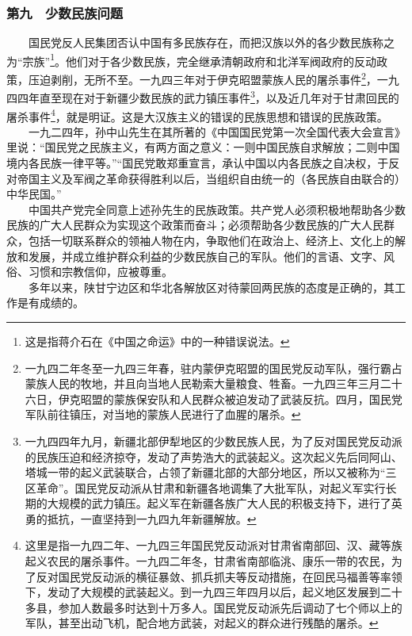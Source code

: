\documentclass[cn,11pt,chinese]{elegantbook}
\def\myformat#1{\hfil\hfil #1}
\begin{document}
\subsubsection*{\myformat{第九　少数民族问题}}
　　国民党反人民集团否认中国有多民族存在，而把汉族以外的各少数民族称之为“宗族”\footnote[23]{  这是指蒋介石在《中国之命运》中的一种错误说法。}。他们对于各少数民族，完全继承清朝政府和北洋军阀政府的反动政策，压迫剥削，无所不至。一九四三年对于伊克昭盟蒙族人民的屠杀事件\footnote[24]{ 一九四二年冬至一九四三年春，驻内蒙伊克昭盟的国民党反动军队，强行霸占蒙族人民的牧地，并且向当地人民勒索大量粮食、牲畜。一九四三年三月二十六日，伊克昭盟的蒙族保安队和人民群众被迫发动了武装反抗。四月，国民党军队前往镇压，对当地的蒙族人民进行了血腥的屠杀。}，一九四四年直至现在对于新疆少数民族的武力镇压事件\footnote[25]{ 一九四四年九月，新疆北部伊犁地区的少数民族人民，为了反对国民党反动派的民族压迫和经济掠夺，发动了声势浩大的武装起义。这次起义先后同阿山、塔城一带的起义武装联合，占领了新疆北部的大部分地区，所以又被称为“三区革命”。国民党反动派从甘肃和新疆各地调集了大批军队，对起义军实行长期的大规模的武力镇压。起义军在新疆各族广大人民的积极支持下，进行了英勇的抵抗，一直坚持到一九四九年新疆解放。}，以及近几年对于甘肃回民的屠杀事件\footnote[26]{ 这里是指一九四二年、一九四三年国民党反动派对甘肃省南部回、汉、藏等族起义农民的屠杀事件。一九四二年冬，甘肃省南部临洮、康乐一带的农民，为了反对国民党反动派的横征暴敛、抓兵抓夫等反动措施，在回民马福善等率领下，发动了大规模的武装起义。到一九四三年四月以后，起义地区发展到二十多县，参加人数最多时达到十万多人。国民党反动派先后调动了七个师以上的军队，甚至出动飞机，配合地方武装，对起义的群众进行残酷的屠杀。}，就是明证。这是大汉族主义的错误的民族思想和错误的民族政策。\\
　　一九二四年，孙中山先生在其所著的《中国国民党第一次全国代表大会宣言》里说：“国民党之民族主义，有两方面之意义：一则中国民族自求解放；二则中国境内各民族一律平等。”“国民党敢郑重宣言，承认中国以内各民族之自决权，于反对帝国主义及军阀之革命获得胜利以后，当组织自由统一的（各民族自由联合的）中华民国。”\\
　　中国共产党完全同意上述孙先生的民族政策。共产党人必须积极地帮助各少数民族的广大人民群众为实现这个政策而奋斗；必须帮助各少数民族的广大人民群众，包括一切联系群众的领袖人物在内，争取他们在政治上、经济上、文化上的解放和发展，并成立维护群众利益的少数民族自己的军队。他们的言语、文字、风俗、习惯和宗教信仰，应被尊重。\\
　　多年以来，陕甘宁边区和华北各解放区对待蒙回两民族的态度是正确的，其工作是有成绩的。\\
\end{document}
